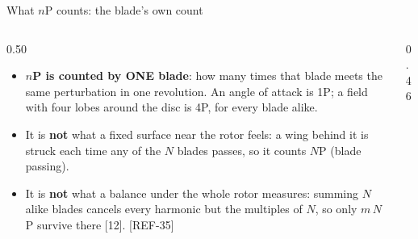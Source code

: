 \begin{frame}{What \(n\)P counts: the blade's own count}
\begin{columns}[T]
\begin{column}{0.50\textwidth}
\begin{itemize}\small
  \item \textbf{\(n\)P is counted by ONE blade}: how many times that blade
        meets the same perturbation in one revolution. An angle of attack
        is 1P; a field with four lobes around the disc is 4P, for every blade
        alike.
  \item It is \textbf{not} what a fixed surface near the rotor feels: a wing
        behind it is struck each time any of the \(N\) blades passes, so it
        counts \(N\)P (blade passing).
  \item It is \textbf{not} what a balance under the whole rotor measures:
        summing \(N\) alike blades cancels every harmonic but the multiples
        of \(N\), so only \(m\,N\)P survive there [12]. [REF-35]
\end{itemize}
\end{column}
\begin{column}{0.46\textwidth}
\centering
{}
\end{column}
\end{columns}
\end{frame}

